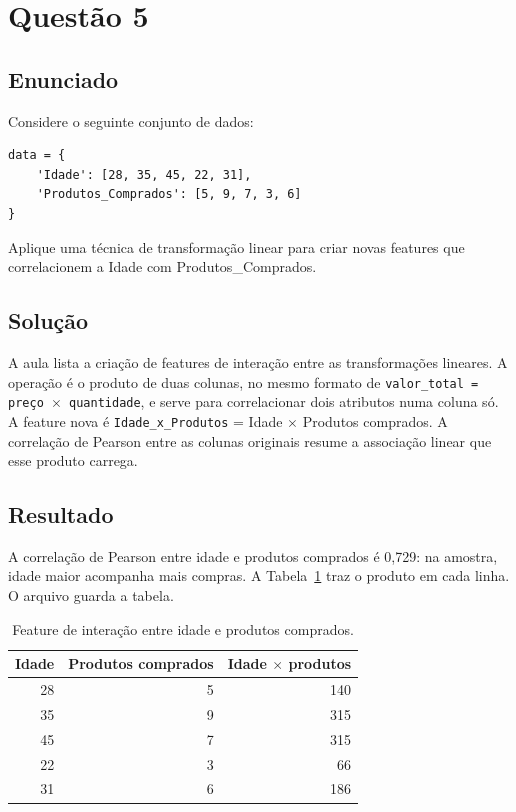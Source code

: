 \section{Questão 5}

\subsection{Enunciado}

Considere o seguinte conjunto de dados:
\begin{verbatim}
data = {
    'Idade': [28, 35, 45, 22, 31],
    'Produtos_Comprados': [5, 9, 7, 3, 6]
}
\end{verbatim}
Aplique uma técnica de transformação linear para criar novas features que correlacionem a Idade com Produtos\_Comprados.

\subsection{Solução}

A aula lista a criação de features de interação entre as transformações lineares. A operação é o produto de duas colunas, no mesmo formato de \texttt{valor\_total = preço \(\times\) quantidade}, e serve para correlacionar dois atributos numa coluna só. A feature nova é \texttt{Idade\_x\_Produtos} = Idade \(\times\) Produtos comprados. A correlação de Pearson entre as colunas originais resume a associação linear que esse produto carrega.

\subsection{Resultado}

A correlação de Pearson entre idade e produtos comprados é 0,729: na amostra, idade maior acompanha mais compras. A Tabela~\ref{tab:q5-interacao} traz o produto em cada linha. O arquivo  guarda a tabela.

\begin{table}[H]
    \centering
    \caption{Feature de interação entre idade e produtos comprados.}
    \label{tab:q5-interacao}
    \footnotesize
    \setlength{\tabcolsep}{8pt}
    \begin{tabular}{@{}rrr@{}}
        \toprule
        Idade & Produtos comprados & Idade \(\times\) produtos \\
        \midrule
        28 & 5 & 140 \\
        35 & 9 & 315 \\
        45 & 7 & 315 \\
        22 & 3 &  66 \\
        31 & 6 & 186 \\
        \bottomrule
    \end{tabular}
\end{table}
